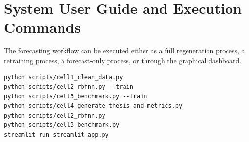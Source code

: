 \section{System User Guide and Execution Commands}
The forecasting workflow can be executed either as a full regeneration process, a retraining process, a forecast-only process, or through the graphical dashboard.

\begin{verbatim}
python scripts/cell1_clean_data.py
python scripts/cell2_rbfnn.py --train
python scripts/cell3_benchmark.py --train
python scripts/cell4_generate_thesis_and_metrics.py
python scripts/cell2_rbfnn.py
python scripts/cell3_benchmark.py
streamlit run streamlit_app.py
\end{verbatim}

